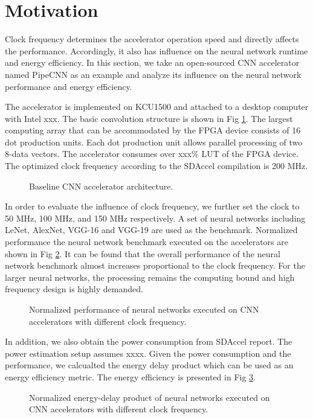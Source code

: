 \section{Motivation} \label{sec:motivation}
Clock frequency determines the accelerator operation speed 
and directly affects the performance. Accordingly, it also has influence on the 
neural network runtime and energy efficiency. In this section, we take 
an open-sourced CNN accelerator named PipeCNN \cite{pipecnn_2} as an example and analyze its 
influence on the neural network performance and energy efficiency.

The accelerator is implemented on KCU1500 and attached to a desktop computer with 
Intel xxx. The basic convolution structure is shown in Fig \ref{fig:cnn-arch}. The largest computing 
array that can be accommodated by the FPGA device consists of 16 dot production units. 
Each dot production unit allows parallel processing of two 8-data vectors.
The accelerator consumes over xxx\% LUT of the FPGA device. The optimized clock frequency 
according to the SDAccel compilation is 200 MHz. 

\begin{figure}
    \caption{Baseline CNN accelerator architecture.}
\label{fig:cnn-arch}
\vspace{-1em}
\end{figure}


In order to evaluate the influence of clock 
frequency, we further set the clock to 50 MHz, 100 MHz, and 150 MHz respectively.
A set of neural networks including LeNet, AlexNet, VGG-16 and VGG-19 are used as the benchmark.
Normalized performance the neural network benchmark executed on the accelerators are 
shown in Fig \ref{fig:computing-bound}. It can be found that the 
overall performance of the neural network benchmark
almost increases proportional to the clock frequency. For the larger neural networks, 
the processing remains the computing bound and high frequency design is highly demanded.

\begin{figure}
    \caption{Normalized performance of neural networks executed on CNN accelerators with different clock frequency.}
\label{fig:computing-bound}
\vspace{-1em}
\end{figure}

In addition, we also obtain the power consumption from SDAccel report. 
The power estimation setup assumes xxxx. Given the power consumption and the performance, 
we calcualted the energy delay product which can be used as an energy efficiency metric.
The energy efficiency is presented in Fig \ref{fig:edp}.
\begin{figure}
    \caption{Normalized energy-delay product of neural networks executed on CNN accelerators with different clock frequency.}
\label{fig:edp}
\vspace{-1em}
\end{figure}

